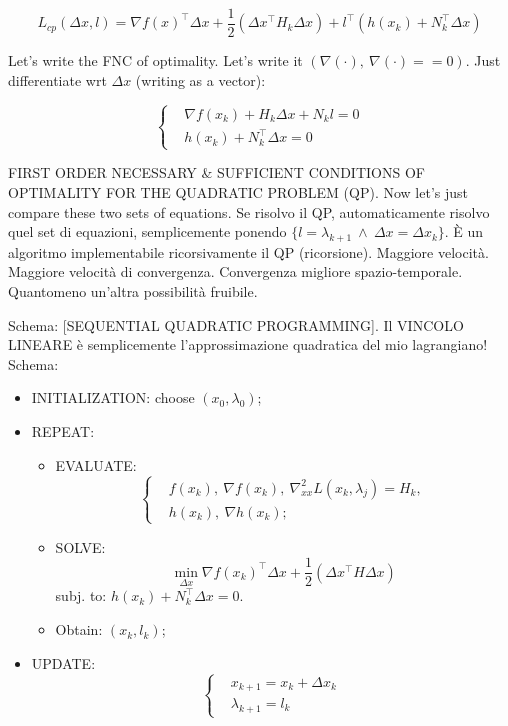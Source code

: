 \[
	L_{cp}(\Delta x,l) = \nabla{f(x)}^\top\Delta x + \frac{1}{2}(\Delta x^\top H_k\Delta x) + l^\top(h(x_k) + N_k^\top\Delta x)
\]

Let's write the FNC of optimality. Let's write it $(\nabla{(\mathord{\cdot})},\ \nabla{(\mathord{\cdot})} == 0)$. Just differentiate wrt $\Delta x$ (writing as a vector):

\[
	\left\{
	\begin{aligned}
	&\nabla{f(x_k)} + H_k\Delta x + N_kl = 0\\
	&h(x_k) + N_k^\top\Delta x = 0
	\end{aligned}
	\right.
\]	

FIRST ORDER NECESSARY \& SUFFICIENT CONDITIONS OF OPTIMALITY FOR THE QUADRATIC PROBLEM (QP). 
Now let's just compare these two sets of equations. Se risolvo il QP, automaticamente risolvo quel set di equazioni, semplicemente ponendo $\{l=\lambda_{k+1}\ \land\ \Delta x=\Delta x_k\}$. \`E un algoritmo implementabile ricorsivamente il QP (ricorsione). Maggiore velocità. Maggiore velocità di convergenza. Convergenza migliore spazio-temporale. Quantomeno un'altra possibilità fruibile.

Schema: [SEQUENTIAL QUADRATIC PROGRAMMING]. Il VINCOLO LINEARE è semplicemente l'approssimazione quadratica del mio lagrangiano! Schema:
\begin{itemize}
\item{INITIALIZATION}: choose $(x_0,\lambda_0)$;
\item{REPEAT}:
\begin{itemize}
\item{EVALUATE}:
\[
	\left\{
	\begin{aligned}
	&f(x_k),\ \nabla{f(x_k)},\ \nabla^2_{xx}{L(x_k,\lambda_j)} = H_k,\\
	&h(x_k),\ \nabla{h(x_k)};
	\end{aligned}
	\right.
\]
\item{SOLVE}:
\[
	\min_{\Delta x}{\nabla{f(x_k)}^\top\Delta x + \frac{1}{2}(\Delta x^\top H\Delta x)}
\]
subj. to: $h(x_k) + N_k^\top\Delta x = 0$.
\item{Obtain}: $(x_k,l_k)$;
\end{itemize}
\item{UPDATE}:
\[	
	\left\{
	\begin{aligned}
	&x_{k+1} = x_k + \Delta x_k\\
	&\lambda_{k+1}=l_k
	\end{aligned}
	\right.
\]
\end{itemize}

